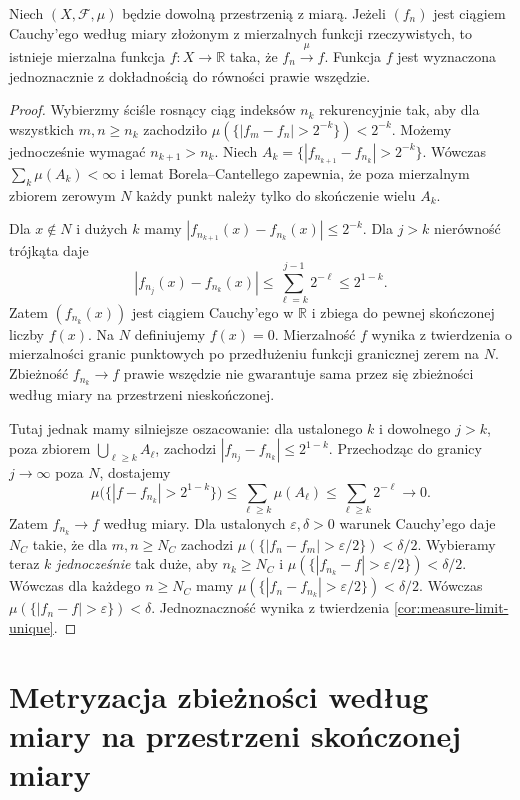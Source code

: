 \begin{twierdzenie}
\label{thm:cauchy-measure-complete-9}
Niech $(X,\mathcal F,\mu)$ będzie dowolną przestrzenią
z miarą. Jeżeli $(f_n)$ jest ciągiem Cauchy'ego według
miary złożonym z mierzalnych funkcji rzeczywistych,
to istnieje mierzalna funkcja $f:X\to\mathbb R$ taka,
że $f_n\xrightarrow{\mu}f$. Funkcja $f$ jest wyznaczona
jednoznacznie z dokładnością do równości prawie wszędzie.
\end{twierdzenie}
\begin{proof}
Wybierzmy ściśle rosnący ciąg indeksów $n_k$
rekurencyjnie tak, aby dla wszystkich $m,n\ge n_k$
zachodziło
$\mu(\{|f_m-f_n|>2^{-k}\})<2^{-k}$.
Możemy jednocześnie wymagać $n_{k+1}>n_k$.
Niech
$A_k=\{|f_{n_{k+1}}-f_{n_k}|>2^{-k}\}$.
Wówczas $\sum_k\mu(A_k)<\infty$ i lemat
Borela--Cantellego zapewnia, że poza mierzalnym
zbiorem zerowym $N$ każdy punkt należy tylko do
skończenie wielu $A_k$.

Dla $x\notin N$ i dużych $k$ mamy
$|f_{n_{k+1}}(x)-f_{n_k}(x)|\le2^{-k}$.
Dla $j>k$ nierówność trójkąta daje
\[
|f_{n_j}(x)-f_{n_k}(x)|
\le\sum_{\ell=k}^{j-1}2^{-\ell}\le2^{1-k}.
\]
Zatem $(f_{n_k}(x))$ jest ciągiem Cauchy'ego w
$\mathbb R$ i zbiega do pewnej skończonej liczby
$f(x)$. Na $N$ definiujemy $f(x)=0$.
Mierzalność $f$ wynika z twierdzenia o mierzalności
granic punktowych po przedłużeniu funkcji granicznej
zerem na $N$. Zbieżność $f_{n_k}\to f$ prawie
wszędzie nie gwarantuje sama przez się zbieżności
według miary na przestrzeni nieskończonej.

Tutaj jednak mamy silniejsze oszacowanie: dla
ustalonego $k$ i dowolnego $j>k$, poza zbiorem
$\bigcup_{\ell\ge k}A_\ell$, zachodzi
$|f_{n_j}-f_{n_k}|\le2^{1-k}$.
Przechodząc do granicy $j\to\infty$ poza $N$,
dostajemy
\[
\mu\bigl(\{|f-f_{n_k}|>2^{1-k}\}\bigr)
\le\sum_{\ell\ge k}\mu(A_\ell)
\le\sum_{\ell\ge k}2^{-\ell}\longrightarrow0.
\]
Zatem $f_{n_k}\to f$ według miary.
Dla ustalonych $\varepsilon,\delta>0$ warunek
Cauchy'ego daje $N_C$ takie, że dla $m,n\ge N_C$
zachodzi
$\mu(\{|f_n-f_m|>\varepsilon/2\})<\delta/2$.
Wybieramy teraz $k$ \emph{jednocześnie} tak duże,
aby $n_k\ge N_C$ i
$\mu(\{|f_{n_k}-f|>\varepsilon/2\})<\delta/2$.
Wówczas dla każdego $n\ge N_C$ mamy
$\mu(\{|f_n-f_{n_k}|>\varepsilon/2\})<\delta/2$.
Wówczas $\mu(\{|f_n-f|>\varepsilon\})<\delta$.
Jednoznaczność wynika z twierdzenia
\ref{cor:measure-limit-unique}.
\end{proof}

\section{Metryzacja zbieżności według miary na przestrzeni skończonej miary}

